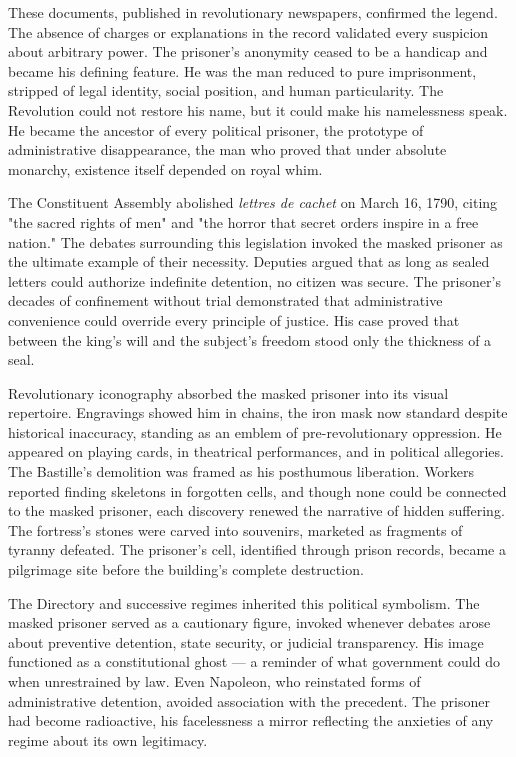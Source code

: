 These documents, published in revolutionary newspapers, confirmed the legend. The absence of charges or explanations in the record validated every suspicion about arbitrary power. The prisoner's anonymity ceased to be a handicap and became his defining feature. He was the man reduced to pure imprisonment, stripped of legal identity, social position, and human particularity. The Revolution could not restore his name, but it could make his namelessness speak. He became the ancestor of every political prisoner, the prototype of administrative disappearance, the man who proved that under absolute monarchy, existence itself depended on royal whim.

The Constituent Assembly abolished \textit{lettres de cachet} on March 16, 1790, citing "the sacred rights of men" and "the horror that secret orders inspire in a free nation." The debates surrounding this legislation invoked the masked prisoner as the ultimate example of their necessity. Deputies argued that as long as sealed letters could authorize indefinite detention, no citizen was secure. The prisoner's decades of confinement without trial demonstrated that administrative convenience could override every principle of justice. His case proved that between the king's will and the subject's freedom stood only the thickness of a seal.

Revolutionary iconography absorbed the masked prisoner into its visual repertoire. Engravings showed him in chains, the iron mask now standard despite historical inaccuracy, standing as an emblem of pre-revolutionary oppression. He appeared on playing cards, in theatrical performances, and in political allegories. The Bastille's demolition was framed as his posthumous liberation. Workers reported finding skeletons in forgotten cells, and though none could be connected to the masked prisoner, each discovery renewed the narrative of hidden suffering. The fortress's stones were carved into souvenirs, marketed as fragments of tyranny defeated. The prisoner's cell, identified through prison records, became a pilgrimage site before the building's complete destruction.

The Directory and successive regimes inherited this political symbolism. The masked prisoner served as a cautionary figure, invoked whenever debates arose about preventive detention, state security, or judicial transparency. His image functioned as a constitutional ghost — a reminder of what government could do when unrestrained by law. Even Napoleon, who reinstated forms of administrative detention, avoided association with the precedent. The prisoner had become radioactive, his facelessness a mirror reflecting the anxieties of any regime about its own legitimacy.

